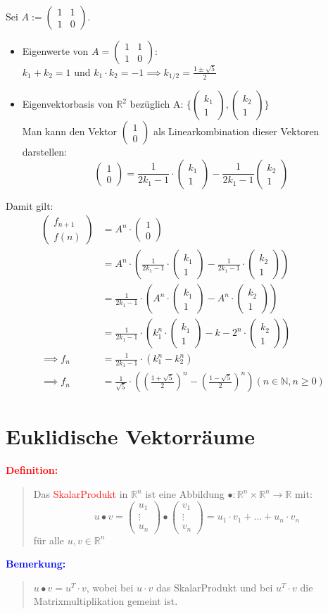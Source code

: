 \documentclass{article}
\newcommand{\red}[1]{\textcolor{red}{#1}}
\newcommand{\blue}[1]{\textcolor{blue}{#1}}
\newcommand{\de}[1]{\red{\textbf{Definition: }}\begin{quote}#1\end{quote}}
\newcommand{\an}[1]{\blue{\textbf{Bemerkung: }}\begin{quote}#1\end{quote}}
\newcommand{\N}{\mathbb{N}}
\newcommand{\R}{\mathbb{R}}
\newcommand{\vvec}[2]{\begin{pmatrix}#1\\#2\end{pmatrix}}
\newcommand{\vvvec}[3]{\begin{pmatrix}#1\\#2\\#3\end{pmatrix}}
\begin{document}
\newpage
Sei $A := \begin{pmatrix}
    1 & 1\\
    1 & 0
\end{pmatrix}$.
\begin{itemize}
    \item Eigenwerte von $A = \begin{pmatrix}
        1 & 1\\
        1 & 0
    \end{pmatrix}:$\\
    $k_1 + k_2 = 1$ und $k_1 \cdot k_2 = -1 \implies k_{1/2} = \frac{1 \pm \sqrt{5}}{2}$
    \item Eigenvektorbasis von $\R^2$ bezüglich A: $\{\vvec{k_1}{1}, \vvec{k_2}{1}\}$\\
    Man kann den Vektor $\vvec{1}{0}$ als Linearkombination dieser Vektoren\\
    darstellen:
    \[
        \vvec{1}{0} = \frac{1}{2k_1-1} \cdot \vvec{k_1}{1} - \frac{1}{2k_1-1} \vvec{k_2}{1}
    \]
\end{itemize}
Damit gilt:
\begin{align*}
    \vvec{f_{n+1}}{f(n)} &= A^n \cdot \vvec{1}{0}\\
    &= A^n \cdot (\frac{1}{2k_1-1} \cdot \vvec{k_1}{1} - \frac{1}{2k_1-1} \cdot \vvec{k_2}{1})\\
    &= \frac{1}{2k_1-1} \cdot (A^n \cdot \vvec{k_1}{1} - A^n \cdot \vvec{k_2}{1})\\
    &= \frac{1}{2k_1-1} \cdot (k_1^n \cdot \vvec{k_1}{1} - k-2^n \cdot \vvec{k_2}{1})\\
    \implies f_n &= \frac{1}{2k_1-1} \cdot (k_1^n - k_2^n)\\
    \implies f_n &= \frac{1}{\sqrt{5}} \cdot ((\frac{1 + \sqrt{5}}{2})^n - (\frac{1 - \sqrt{5}}{2})^n) (n \in \N, n \ge 0)
\end{align*}

\newpage
\section{Euklidische Vektorräume}

\de{
    Das \red{SkalarProdukt} in $\R^n$ ist eine Abbildung $\bullet: \R^n \times \R^n \to \R$ mit:
    \[
        u \bullet v = \vvvec{u_1}{\vdots}{u_n} \bullet \vvvec{v_1}{\vdots}{v_n} = u_1 \cdot v_1 + \dots + u_n \cdot v_n
    \]
    für alle $u, v \in \R^n$
}

\an{
    $u \bullet v = u^T \cdot v$, wobei bei $u \cdot v$ das SkalarProdukt und bei $u^T \cdot v$ die Matrixmultiplikation gemeint ist.
}
\end{document}
